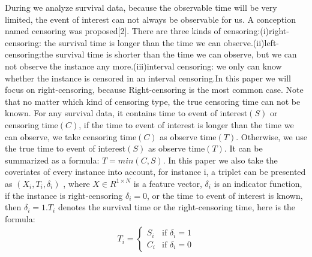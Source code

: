 \documentclass[conference]{IEEEconf}
\begin{document}
During we analyze survival data, because the observable time will be very limited, the event of interest can not always be observable for us. A conception named censoring was proposed[2].  There are three kinds of censoring:(i)right-censoring: the survival time is longer than the time we can observe.(ii)left-censoring:the survival time is shorter than the time we can observe, but we can not observe the instance any more.(iii)interval censoring: we only can know whether the instance is censored in an interval censoring.In this paper we will focus on right-censoring, because Right-censoring is the most common case. Note that no matter which kind of censoring type, the true censoring time can not be known.
For any survival data, it contains time to event of interest$(S)$ or censoring time$(C)$, if the time to event of interest is longer than the time we can observe, we take censoring time$(C)$ as observe time$(T)$. Otherwise, we use the true time to event of interest$(S)$ as observe time$(T)$. It can be summarized as a formula: $T = min(C,S)$. In this paper we also take the coveriates of every instance into account, for instance i, a triplet can be presented as  $(X_{i},T_{i},\delta_{i})$ , where $X\in R^{1\times N}$ is a feature vector, $\delta_{i}$ is an indicator function, if the instance is right-censoring $\delta_{i} = 0$, or the time to event of interest is known, then $\delta_{i} = 1$.$T_{i}$ denotes the survival time or the right-censoring time, here is the formula:
\begin{eqnarray}
	T_{i} = \begin{cases}
		S_{i} &\text{if } \delta_{i} = 1 \\
		C_{i} &\text{if } \delta_{i} = 0
	\end{cases}
\end{eqnarray}
\end{document}
